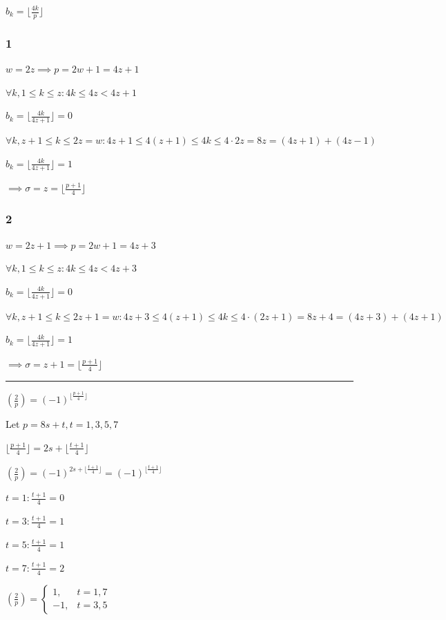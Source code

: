 \documentclass{article}
\begin{document}
\( b_{k} = \lfloor{\frac{4k}{p}}\rfloor \)

\subsubsection*{1}

\( w = 2z \implies p = 2w + 1 = 4z + 1 \)

\( \forall k, 1 \leq k \leq z:  4k \leq 4z < 4z + 1 \)

\( b_{k} = \lfloor{\frac{4k}{4z+1}}\rfloor = 0 \)

\( \forall k, z+1 \leq k \leq 2z = w: 4z + 1 \leq 4(z + 1) \leq 4k \leq 4\cdot2z = 8z = (4z + 1) + (4z-1) \)

\( b_{k} = \lfloor{\frac{4k}{4z+1}}\rfloor = 1 \)

\( \implies \sigma = z = \lfloor{\frac{p+1}{4}}\rfloor \)

\subsubsection*{2}

\( w = 2z+1 \implies p = 2w + 1 = 4z + 3 \)

\( \forall k, 1 \leq k \leq z:  4k \leq 4z < 4z + 3 \)

\( b_{k} = \lfloor{\frac{4k}{4z+1}}\rfloor = 0 \)

\( \forall k, z+1 \leq k \leq 2z + 1 = w: 4z + 3 \leq 4(z + 1) \leq 4k \leq 4\cdot(2z + 1) = 8z + 4 = (4z + 3) + (4z+1) \)

\( b_{k} = \lfloor{\frac{4k}{4z+1}}\rfloor = 1 \)

\( \implies \sigma = z + 1 = \lfloor{\frac{p+1}{4}}\rfloor \)

\bigskip\hrule\bigskip

\( (\frac{2}{p}) = {(-1)}^{\lfloor{\frac{p+1}{4}}\rfloor} \)

Let \( p = 8s + t, t = 1,3,5,7 \)

\( \lfloor \frac{p+1}{4}\rfloor = 2s + \lfloor{\frac{t+1}{4}} \rfloor \)

\( (\frac{2}{p}) = {(-1)}^{2s + \lfloor{\frac{t+1}{4}} \rfloor} = {(-1)}^{\lfloor{\frac{t+1}{4}} \rfloor} \)

\( t = 1: \frac{t+1}{4} = 0 \)

\( t = 3: \frac{t+1}{4} = 1 \)

\( t = 5: \frac{t+1}{4} = 1 \)

\( t = 7: \frac{t+1}{4} = 2 \)

\( (\frac{2}{p})= \left\{\begin{matrix}1, & t=1,7\\-1, &t=3,5\end{matrix}\right. \)
\end{document}
